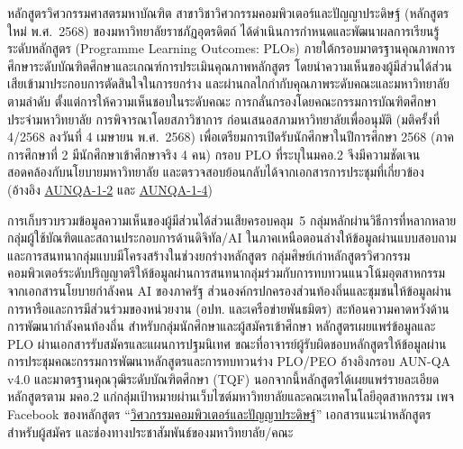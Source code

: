 


หลักสูตรวิศวกรรมศาสตรมหาบัณฑิต สาขาวิชาวิศวกรรมคอมพิวเตอร์และปัญญาประดิษฐ์ (หลักสูตรใหม่ พ.ศ.~2568) ของมหาวิทยาลัยราชภัฏอุตรดิตถ์ ได้ดำเนินการกำหนดและพัฒนาผลการเรียนรู้ระดับหลักสูตร (Programme Learning Outcomes: PLOs) ภายใต้กรอบมาตรฐานคุณภาพการศึกษาระดับบัณฑิตศึกษาและเกณฑ์การประเมินคุณภาพหลักสูตร โดยนำความเห็นของผู้มีส่วนได้ส่วนเสียเข้ามาประกอบการตัดสินใจในการยกร่าง และผ่านกลไกกำกับคุณภาพระดับคณะและมหาวิทยาลัยตามลำดับ ตั้งแต่การให้ความเห็นชอบในระดับคณะ การกลั่นกรองโดยคณะกรรมการบัณฑิตศึกษาประจำมหาวิทยาลัย การพิจารณาโดยสภาวิชาการ ก่อนเสนอสภามหาวิทยาลัยเพื่ออนุมัติ (มติครั้งที่ 4/2568 ลงวันที่ 4 เมษายน พ.ศ.~2568) เพื่อเตรียมการเปิดรับนักศึกษาในปีการศึกษา 2568 (ภาคการศึกษาที่ 2 มีนักศึกษาเข้าศึกษาจริง 4 คน) กรอบ PLO ที่ระบุในมคอ.2 จึงมีความชัดเจน สอดคล้องกับนโยบายมหาวิทยาลัย และตรวจสอบย้อนกลับได้จากเอกสารการประชุมที่เกี่ยวข้อง (อ้างอิง \hyperlink{ref:AUNQA-1-2}{AUNQA-1-2} และ \hyperlink{ref:AUNQA-1-4}{AUNQA-1-4})

การเก็บรวบรวมข้อมูลความเห็นของผู้มีส่วนได้ส่วนเสียครอบคลุม~5 กลุ่มหลักผ่านวิธีการที่หลากหลาย กลุ่มผู้ใช้บัณฑิตและสถานประกอบการด้านดิจิทัล/AI ในภาคเหนือตอนล่างให้ข้อมูลผ่านแบบสอบถามและการสนทนากลุ่มแบบมีโครงสร้างในช่วงยกร่างหลักสูตร กลุ่มศิษย์เก่าหลักสูตรวิศวกรรมคอมพิวเตอร์ระดับปริญญาตรีให้ข้อมูลผ่านการสนทนากลุ่มร่วมกับการทบทวนแนวโน้มอุตสาหกรรมจากเอกสารนโยบายกำลังคน AI ของภาครัฐ ส่วนองค์กรปกครองส่วนท้องถิ่นและชุมชนให้ข้อมูลผ่านการหารือและการมีส่วนร่วมของหน่วยงาน (อปท. และเครือข่ายพันธมิตร) สะท้อนความคาดหวังด้านการพัฒนากำลังคนท้องถิ่น สำหรับกลุ่มนักศึกษาและผู้สมัครเข้าศึกษา หลักสูตรเผยแพร่ข้อมูลและ PLO ผ่านเอกสารรับสมัครและแผนการปฐมนิเทศ ขณะที่อาจารย์ผู้รับผิดชอบหลักสูตรให้ข้อมูลผ่านการประชุมคณะกรรมการพัฒนาหลักสูตรและการทบทวนร่าง PLO/PEO อ้างอิงกรอบ AUN-QA v4.0 และมาตรฐานคุณวุฒิระดับบัณฑิตศึกษา (TQF) นอกจากนี้หลักสูตรได้เผยแพร่รายละเอียดหลักสูตรตาม มคอ.2 แก่กลุ่มเป้าหมายผ่านเว็บไซต์มหาวิทยาลัยและคณะเทคโนโลยีอุตสาหกรรม เพจ Facebook ของหลักสูตร ``\href{https://web.facebook.com/profile.php?id=61577236346855}{วิศวกรรมคอมพิวเตอร์และปัญญาประดิษฐ์}'' เอกสารแนะนำหลักสูตรสำหรับผู้สมัคร และช่องทางประชาสัมพันธ์ของมหาวิทยาลัย/คณะ


